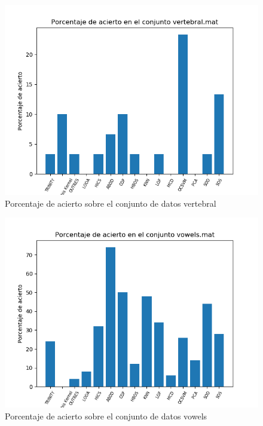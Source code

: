 \begin{figure}[H]
	\centering
	\includegraphics[scale=0.7]{imagenes/imgs-exp1/accuracy/vertebral}
	\caption{Porcentaje de acierto sobre el conjunto de datos vertebral}
	\label{vertebral_accuracy}
\end{figure}

\begin{figure}[H]
	\centering
	\includegraphics[scale=0.7]{imagenes/imgs-exp1/accuracy/vowels}
	\caption{Porcentaje de acierto sobre el conjunto de datos vowels}
	\label{vowels_accuracy}
\end{figure}

